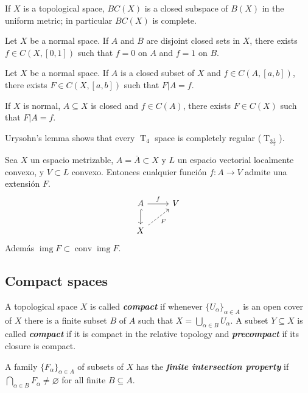 \documentclass{article}
\theoremstyle{definition}
\numberwithin{equation}{section}
\DeclareMathOperator{\img}{img}
\begin{document}
	\begin{prop}
		If $X$ is a topological space, $BC(X)$ is a closed subspace of $B(X)$ in the uniform metric; in particular $BC(X)$ is complete.
	\end{prop}
	\begin{lemma}[Urysohn]
		Let $X$ be a normal space. If $A$ and $B$ are disjoint closed sets in $X$, there exists $f\in C(X,[0,1])$ such that $f=0$ on $A$ and $f=1$ on $B$.
	\end{lemma}
	\begin{thm}
		Let $X$ be a normal space. If $A$ is a closed subset of $X$ and $f\in C(A,[a,b])$, there exists $F\in C(X,[a,b])$ such that $F|A=f$.
	\end{thm}
	\begin{coro}
		If $X$ is normal, $A\subseteq X$ is closed and $f\in C(A)$, there exists $F\in C(X)$ such that $F|A=f$.
	\end{coro}
	Urysohn's lemma shows that every $\operatorname{T}_4$ space is completely regular ($\operatorname{T}_{3\frac{1}{2}}$).
	\begin{thm}[Dugundji]
		Sea $X$ un espacio metrizable, $A=\bar{A}\subset X$ y $L$ un espacio vectorial localmente convexo, y $V\subset L$ convexo. Entonces cualquier función $f:A\to V$ admite una extensión $F$.
		\[\begin{tikzcd}
			A\arrow[r,"f"]\arrow[hook,d]&V\\
			X\arrow[ur,dashed,"F",swap]
		\end{tikzcd}\]
		Además $\img F\subset\operatorname{conv}\img F$.
	\end{thm}
	
		\subsection{Compact spaces}
	
		A topological space $X$ is called \textbf{\textit{compact}} if whenever $\{U_\alpha\}_{\alpha\in A}$ is an open cover of $X$ there is a finite subset $B$ of $A$ such that $X=\bigcup_{\alpha\in B}U_\alpha$. A subset $Y\subseteq X$ is called \textbf{\textit{compact}} if it is compact in the relative topology and \textbf{\textit{precompact}} if its closure is compact.
		
		A family $\{F_\alpha\}_{\alpha\in A}$ of subsets of $X$ has the \textbf{\textit{finite intersection property}} if $\bigcap_{\alpha\in B}F_\alpha\neq\varnothing$ for all finite $B\subseteq A$.
		
\end{document}
